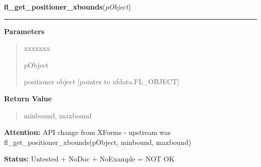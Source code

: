 \hspace{.8\funcindent}\begin{boxedminipage}{\funcwidth}

    \raggedright \textbf{fl\_get\_positioner\_xbounds}(\textit{pObject})

    \vspace{-1.5ex}

    \rule{\textwidth}{0.5\fboxrule}
\setlength{\parskip}{2ex}
\setlength{\parskip}{1ex}
      \textbf{Parameters}
      \vspace{-1ex}

      \begin{quote}
        \begin{Ventry}{xxxxxxx}

          \item[pObject]

          positioner object [pointer to xfdata.FL\_OBJECT]

        \end{Ventry}

      \end{quote}

      \textbf{Return Value}
    \vspace{-1ex}

      \begin{quote}
      minbound, maxbound

      \end{quote}

\textbf{Attention:} API change from XForms - upstream was fl\_get\_positioner\_xbounds(pObject,
minbound, maxbound)



\textbf{Status:} Untested + NoDoc + NoExample = NOT OK



    \end{boxedminipage}

    \label{xformslib:library:fl_set_positioner_yvalue}

    \vspace{0.5ex}

